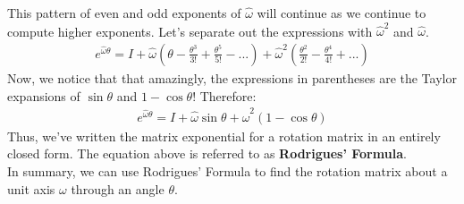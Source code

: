 \documentclass[oneside]{book}
\begin{document}
This pattern of even and odd exponents of $\hat\omega$ will continue as we continue to compute higher exponents. Let's separate out the expressions with $\hat\omega^2$ and $\hat\omega$. 
\begin{align}
    e^{\hat\omega \theta} = I + \hat\omega(\theta - \frac{\theta^3}{3!} + \frac{\theta^5}{5!} - ...) + \hat\omega^2(\frac{\theta^2}{2!} - \frac{\theta^4}{4!} + ...)
\end{align}
Now, we notice that that amazingly, the expressions in parentheses are the Taylor expansions of $\sin\theta$ and $1 - \cos\theta$! Therefore:
\begin{align}
     e^{\hat\omega \theta} = I + \hat\omega\sin\theta + \hat\omega^2(1-\cos\theta)
\end{align}
Thus, we've written the matrix exponential for a rotation matrix in an entirely closed form. The equation above is referred to as \textbf{Rodrigues' Formula}.\\
In summary, we can use Rodrigues' Formula to find the rotation matrix about a unit axis $\omega$ through an angle $\theta$.
\end{document}
